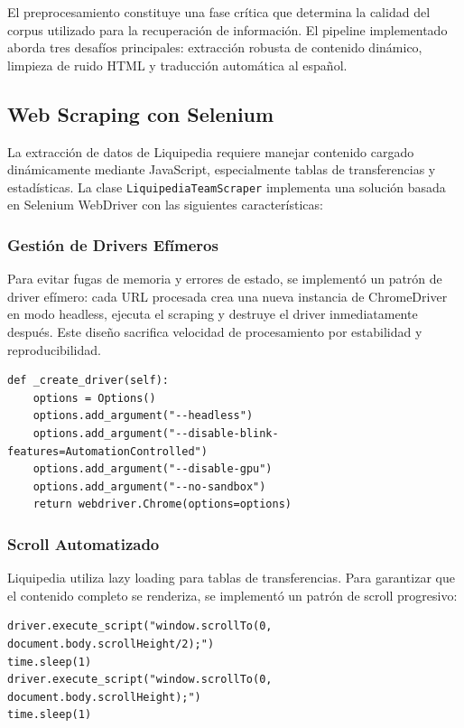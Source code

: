 El preprocesamiento constituye una fase crítica que determina la calidad del corpus utilizado para la recuperación de información. El pipeline implementado aborda tres desafíos principales: extracción robusta de contenido dinámico, limpieza de ruido HTML y traducción automática al español.

\subsection{Web Scraping con Selenium}

La extracción de datos de Liquipedia requiere manejar contenido cargado dinámicamente mediante JavaScript, especialmente tablas de transferencias y estadísticas. La clase \texttt{LiquipediaTeamScraper} implementa una solución basada en Selenium WebDriver con las siguientes características:

\subsubsection{Gestión de Drivers Efímeros}

Para evitar fugas de memoria y errores de estado, se implementó un patrón de driver efímero: cada URL procesada crea una nueva instancia de ChromeDriver en modo headless, ejecuta el scraping y destruye el driver inmediatamente después. Este diseño sacrifica velocidad de procesamiento por estabilidad y reproducibilidad.

\begin{verbatim}
def _create_driver(self):
    options = Options()
    options.add_argument("--headless")
    options.add_argument("--disable-blink-features=AutomationControlled")
    options.add_argument("--disable-gpu")
    options.add_argument("--no-sandbox")
    return webdriver.Chrome(options=options)
\end{verbatim}

\subsubsection{Scroll Automatizado}

Liquipedia utiliza lazy loading para tablas de transferencias. Para garantizar que el contenido completo se renderiza, se implementó un patrón de scroll progresivo:

\begin{verbatim}
driver.execute_script("window.scrollTo(0, document.body.scrollHeight/2);")
time.sleep(1)
driver.execute_script("window.scrollTo(0, document.body.scrollHeight);")
time.sleep(1)
\end{verbatim}


